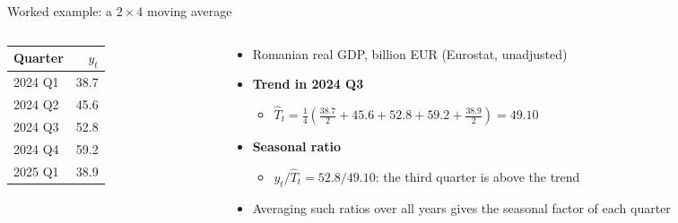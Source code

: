 \begin{frame}{Worked example: a $2 \times 4$ moving average}
\itemsize{\footnotesize}
\begin{columns}[T]
\begin{column}{0.32\textwidth}
\begin{center}
\footnotesize
\begin{tabular}{lr}
\toprule
\textbf{Quarter} & \textbf{$y_t$} \\
\midrule
2024 Q1 & 38.7 \\
2024 Q2 & 45.6 \\
2024 Q3 & 52.8 \\
2024 Q4 & 59.2 \\
2025 Q1 & 38.9 \\
\bottomrule
\end{tabular}
\end{center}

\end{column}
\begin{column}{0.64\textwidth}
\begin{itemize}
    \item Romanian real GDP, billion EUR (Eurostat, unadjusted)
    \item \textbf{Trend in 2024 Q3}
    \begin{itemize}
        \item $\hat T_t = \frac{1}{4}\left(\frac{38.7}{2} + 45.6 + 52.8 + 59.2 + \frac{38.9}{2}\right) = 49.10$
    \end{itemize}
    \item \textbf{Seasonal ratio}
    \begin{itemize}
        \item $y_t / \hat T_t = 52.8 / 49.10$: the third quarter is above the trend
    \end{itemize}
    \item Averaging such ratios over all years gives the seasonal factor of each quarter
\end{itemize}
\end{column}
\end{columns}
\end{frame}

